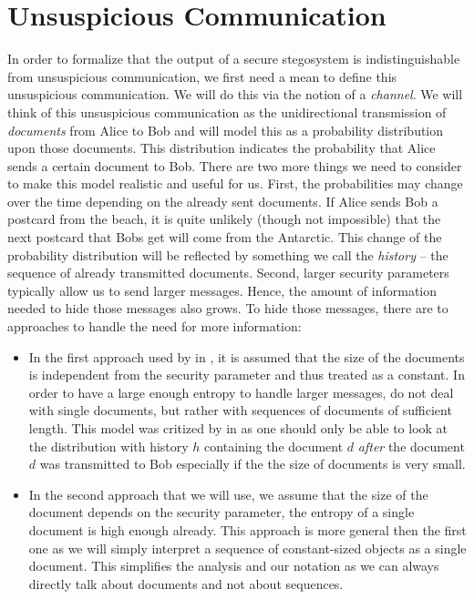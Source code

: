 \section{Unsuspicious Communication}
In order to formalize that the output of a secure stegosystem is
indistinguishable from unsuspicious communication, we first need a mean
to define this unsuspicious communication. We will do this via the
notion of a \emph{channel}. We will think of this unsuspicious
communication as the unidirectional transmission of \emph{documents}
from Alice to Bob and will model this as a probability distribution upon
those documents. This distribution indicates the probability that Alice
sends a certain document to Bob. There are two more things we need to
consider to make this model realistic and useful for us. First, the
probabilities may change over the time depending on the already sent
documents. If Alice sends Bob a postcard from the beach, it is quite
unlikely (though not impossible) that the next postcard that Bobs get
will come from the Antarctic. This change of the probability
distribution will be reflected by something we call the \emph{history}
-- the sequence of already transmitted documents. Second, larger
security parameters typically allow us to send larger messages. Hence,
the amount of information needed to hide those messages also grows. 
To hide those messages, there are to approaches to handle the need for
more information:
\begin{itemize}
\item In the first approach used by \citeauthor{hopper2009provably} in
  \cite{hopper2009provably}, it is assumed that the size of the
  documents is independent from the security parameter and thus treated
  as a constant. In order to have a large enough entropy to handle
  larger messages, \citeauthor{hopper2009provably} do not deal with
  single documents, but rather with sequences of documents of sufficient
  length. This model was critized by
  \citeauthor{lysyanskaya2006imperfect} in
  \cite{lysyanskaya2006imperfect} as one should only be able to look at
  the distribution with history $h$ containing the document $d$
  \emph{after} the document $d$ was transmitted to Bob especially if the
  the size of documents is very small.
\item In the second approach that we will use, we assume that the size
  of the document depends on the security parameter, \ie the entropy of
  a single document is high enough already. This approach is more
  general then the first one as we will simply interpret a sequence of
  constant-sized objects as a single document. This simplifies the
  analysis and our notation as we can always directly talk about
  documents and not about sequences.
\end{itemize}

